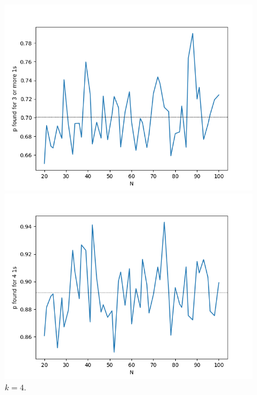 \begin{figure}[!hbt]
            \begin{minipage}{.33\linewidth}
              \centering
                \includegraphics[width = \textwidth]{../images/game2/0111_L_vs_p_MAX_L50-5100.png}
              \caption{$k = 3$.}
              \label{figure-k3}
            \end{minipage}      
            \begin{minipage}{.33\linewidth}
              \centering
                \includegraphics[width = \textwidth]{../images/game2/1111_L_vs_p_MAX_L50-5100.png}
              \caption{$k = 4$.}
              \label{figure-k4}
            \end{minipage}                     
        \end{figure} 

